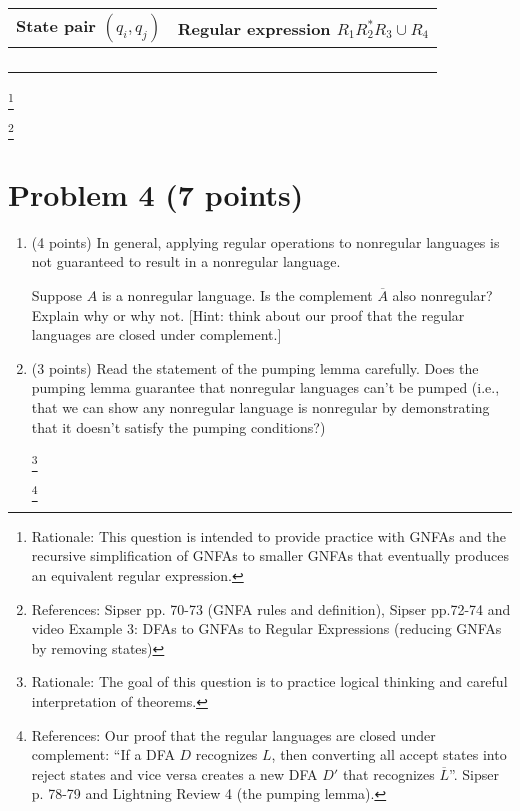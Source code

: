 \documentclass[letterpaper,11pt,twoside]{article}
\theoremstyle{plain}
\theoremstyle{definition}
\theoremstyle{remark}
\theoremstyle{restate}
\newcommand\blfootnote[1]{%
  \begingroup
  \renewcommand\thefootnote{}\footnote{#1}%
  \addtocounter{footnote}{-1}%
  \endgroup
}
\begin{document}
    
    \begin{table}[h!]
    \begin{center}
    \begin{tabular}{l|l}
    State pair $(q_i, q_j)$ & Regular expression $R_1R_2^*R_3 \cup R_4$ \\ \hline
        &      \\
        &      \\
        &    \\
        &    
    \end{tabular}
    \end{center}
    \end{table}
    
    
    \blfootnote{ Rationale: This question is intended to provide practice with GNFAs and the recursive simplification of GNFAs to smaller GNFAs that eventually produces an equivalent regular expression. }
    \blfootnote{ References: Sipser pp. 70-73 (GNFA rules and definition), Sipser pp.72-74 and video Example 3: DFAs to GNFAs to Regular Expressions (reducing GNFAs by removing states) }
    
\clearpage
\section{Problem 4 (7 points)}
\begin{enumerate}
    \item (4 points) In general, applying regular operations to nonregular languages is not guaranteed to result in a nonregular language.
    
    Suppose $A$ is a nonregular language. Is the complement $\overline{A}$ also nonregular? Explain why or why not. [Hint: think about our proof that the regular languages are closed under complement.]
    
    
    \item (3 points) Read the statement of the pumping lemma carefully. Does the pumping lemma guarantee that nonregular languages can't be pumped (i.e., that we can show any nonregular language is nonregular by demonstrating that it doesn't satisfy the pumping conditions?)
    
    \blfootnote{ Rationale: The goal of this question is to practice logical thinking and careful interpretation of theorems. }
    \blfootnote{ References: Our proof that the regular languages are closed under complement: ``If a DFA $D$ recognizes $L$, then converting all accept states into reject states and vice versa creates a new DFA $D'$ that recognizes $\overline{L}$''. Sipser p. 78-79 and Lightning Review 4 (the pumping lemma).  }
\end{enumerate}
\end{document}
